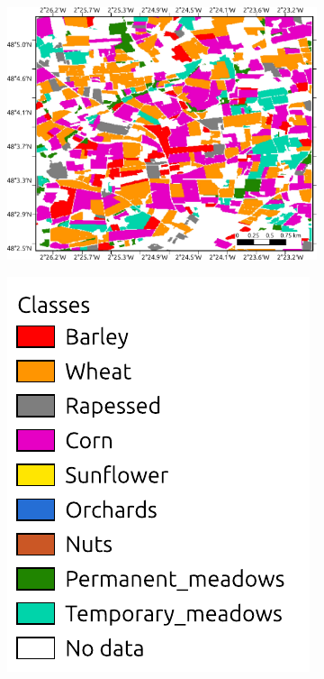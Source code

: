 \documentclass[journal,article,submit,pdftex,moreauthors]{Definitions/mdpi}
\providecommand{\DIFaddbeginFL}{} %
\providecommand{\DIFaddendFL}{} %
\begin{document}
\begin{figure}[H]
\begin{subfigure}[t]{0.28\linewidth}
    \includegraphics[height=\linewidth,width=\textwidth]{figures/aes_1_layer_mse_results/prediction_field_based_format_v2.pdf}
	  \DIFaddendFL \caption{}
	  \label{fig:classification_map_field}
	\end{subfigure}
    \DIFaddbeginFL \begin{subfigure}[t]{0.15\linewidth}
    \includegraphics[width=\textwidth]{figures/aes_1_layer_mse_results/labels.pdf}

\end{subfigure}
\end{figure}
\end{document}
